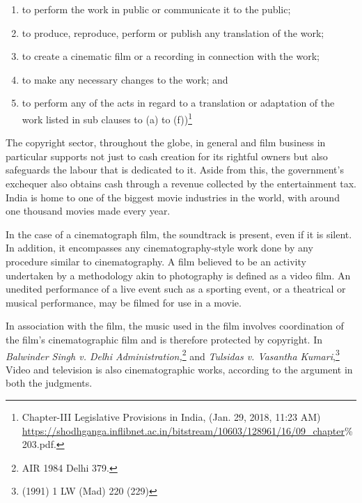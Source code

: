 \begin{multicols}{2}
\begin{enumerate}[label=$\bullet$]
\item to perform the work in public or communicate it to the public;

\item to produce, reproduce, perform or publish any translation of the work;

\item to create a cinematic film or a recording in connection with the work;

\item to make any necessary changes to the work; and

\item to perform any of the acts in regard to a translation or adaptation of the work
listed in sub clauses to (a) to (f))\footnote{Chapter-III Legislative Provisions in India, (Jan. 29, 2018, 11:23 AM)\\
 \url{https://shodhganga.inflibnet.ac.in/bitstream/10603/128961/16/09_chapter}\%203.pdf.}
\end{enumerate}

\vspace{-.4cm}


\noi
The copyright sector, throughout the globe, in general and film business in particular supports
not just to cash creation for its rightful owners but also safeguards the labour that is dedicated
to it. Aside from this, the government's exchequer also obtains cash through a revenue
collected by the entertainment tax. India is home to one of the biggest movie industries in the
world, with around one thousand movies made every year.


\noi
In the case of a cinematograph film, the soundtrack is present, even if it is silent. In addition,
it encompasses any cinematography-style work done by any procedure similar to
cinematography. A film believed to be an activity undertaken by a methodology akin to photography is defined as a video film. An unedited performance of a live event such as a
sporting event, or a theatrical or musical performance, may be filmed for use in a movie.

\noi
In association with the film, the music used in the film involves coordination of the film's
cinematographic film and is therefore protected by copyright. In \textit{Balwinder Singh v. Delhi
Administration,}\footnote{AIR 1984 Delhi 379.} and \textit{Tulsidas v. Vasantha Kumari},\footnote{(1991) 1 LW (Mad) 220 (229)} Video and television is also
cinematographic works, according to the argument in both the judgments.


\end{multicols}
